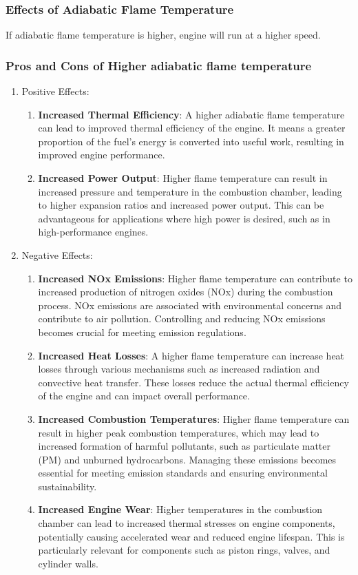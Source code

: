 \documentclass{article}
\begin{document}
\subsubsection*{Effects of Adiabatic Flame Temperature}
If adiabatic flame temperature is higher, engine will run at a higher speed. 

\subsubsection*{Pros and Cons of Higher adiabatic flame temperature}
\begin{enumerate}
  \item Positive Effects:
  \begin{enumerate}
    \item \textbf{Increased Thermal Efficiency}: A higher adiabatic flame temperature can lead to improved thermal efficiency of the engine. It means a greater proportion of the fuel's energy is converted into useful work, resulting in improved engine performance.
    \item \textbf{Increased Power Output}: Higher flame temperature can result in increased pressure and temperature in the combustion chamber, leading to higher expansion ratios and increased power output. This can be advantageous for applications where high power is desired, such as in high-performance engines.
  \end{enumerate}
  
  
  
  
  \item Negative Effects:
  \begin{enumerate}
    \item \textbf{Increased NOx Emissions}: Higher flame temperature can contribute to increased production of nitrogen oxides (NOx) during the combustion process. NOx emissions are associated with environmental concerns and contribute to air pollution. Controlling and reducing NOx emissions becomes crucial for meeting emission regulations.
    \item \textbf{Increased Heat Losses}: A higher flame temperature can increase heat losses through various mechanisms such as increased radiation and convective heat transfer. These losses reduce the actual thermal efficiency of the engine and can impact overall performance.
    \item \textbf{Increased Combustion Temperatures}: Higher flame temperature can result in higher peak combustion temperatures, which may lead to increased formation of harmful pollutants, such as particulate matter (PM) and unburned hydrocarbons. Managing these emissions becomes essential for meeting emission standards and ensuring environmental sustainability.
    \item \textbf{Increased Engine Wear}: Higher temperatures in the combustion chamber can lead to increased thermal stresses on engine components, potentially causing accelerated wear and reduced engine lifespan. This is particularly relevant for components such as piston rings, valves, and cylinder walls.
  \end{enumerate}
  
\end{enumerate}
\end{document}
